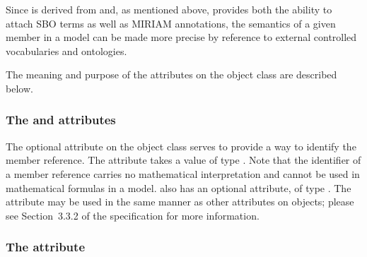 Since \Member is derived from \SBase and, as mentioned above, \SBase provides both the ability to attach SBO terms as well as MIRIAM annotations, the semantics of a given member in a model can be made more precise by reference to external controlled vocabularies and ontologies.

The meaning and purpose of the attributes on the object class are described below.


\subsubsection{The \fixttspace{} and \fixttspace{} attributes}
\label{member-idname-attributes}

The optional  attribute on the \Member object class serves to provide a way to identify the member reference.  The attribute takes a value of type .  Note that the identifier of a member reference carries no mathematical interpretation and cannot be used in mathematical formulas in a model.  \Member also has an optional  attribute, of type .  The  attribute may be used in the same manner as other  attributes on \sbmlthreecore objects; please see Section~3.3.2 of the \sbmlthreecore specification for more information.


\subsubsection{The \fixttspace{} attribute}
\label{member-idref-attribute}

